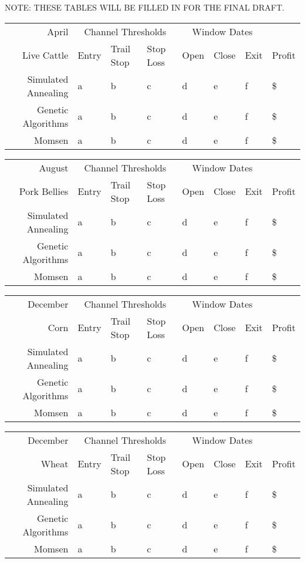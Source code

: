 \documentclass[10pt]{article}
\begin{document}
NOTE: THESE TABLES WILL BE FILLED IN FOR THE FINAL DRAFT.

\begin{tabular}{|r|l|l|l|l|l|l|l|}
  \hline
  April & \multicolumn{3}{|c|}{Channel Thresholds} & \multicolumn{3}{|c|}{Window Dates} &  \\
  Live Cattle & Entry & Trail Stop & Stop Loss & Open & Close & Exit & Profit\\ \hline
  Simulated Annealing & a & b & c & d & e & f & \$ \\ \hline
  Genetic Algorithms & a & b & c & d & e & f & \$ \\ \hline
  Momsen &  a & b & c & d & e & f & \$ \\ \hline
\end{tabular}

\begin{tabular}{|r|l|l|l|l|l|l|l|}
  \hline
  August & \multicolumn{3}{|c|}{Channel Thresholds} & \multicolumn{3}{|c|}{Window Dates} &  \\
  Pork Bellies & Entry & Trail Stop & Stop Loss & Open & Close & Exit & Profit\\ \hline
  Simulated Annealing & a & b & c & d & e & f & \$ \\ \hline
  Genetic Algorithms & a & b & c & d & e & f & \$ \\ \hline
  Momsen &  a & b & c & d & e & f & \$ \\ \hline
\end{tabular}

\begin{tabular}{|r|l|l|l|l|l|l|l|}
  \hline
  December & \multicolumn{3}{|c|}{Channel Thresholds} & \multicolumn{3}{|c|}{Window Dates} &  \\
  Corn & Entry & Trail Stop & Stop Loss & Open & Close & Exit & Profit\\ \hline
  Simulated Annealing & a & b & c & d & e & f & \$ \\ \hline
  Genetic Algorithms & a & b & c & d & e & f & \$ \\ \hline
  Momsen &  a & b & c & d & e & f & \$ \\ \hline
\end{tabular}

\begin{tabular}{|r|l|l|l|l|l|l|l|}
  \hline
  December & \multicolumn{3}{|c|}{Channel Thresholds} & \multicolumn{3}{|c|}{Window Dates} &  \\
  Wheat & Entry & Trail Stop & Stop Loss & Open & Close & Exit & Profit\\ \hline
  Simulated Annealing & a & b & c & d & e & f & \$ \\ \hline
  Genetic Algorithms & a & b & c & d & e & f & \$ \\ \hline
  Momsen &  a & b & c & d & e & f & \$ \\ \hline
\end{tabular}
\end{document}
